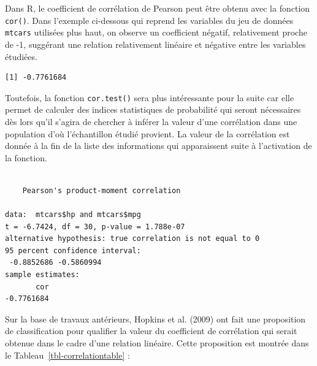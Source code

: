 \documentclass[
  letterpaper,
]{book}
\newenvironment{Shaded}{\begin{snugshade}}{\end{snugshade}}
\newcommand{\AttributeTok}[1]{\textcolor[rgb]{0.40,0.45,0.13}{#1}}
\newcommand{\FunctionTok}[1]{\textcolor[rgb]{0.28,0.35,0.67}{#1}}
\newcommand{\NormalTok}[1]{\textcolor[rgb]{0.00,0.23,0.31}{#1}}
\newcommand{\SpecialCharTok}[1]{\textcolor[rgb]{0.37,0.37,0.37}{#1}}
\newcommand{\StringTok}[1]{\textcolor[rgb]{0.13,0.47,0.30}{#1}}
\begin{document}
Dans R, le coefficient de corrélation de Pearson peut être obtenu avec
la fonction \texttt{cor()}. Dans l'exemple ci-dessous qui reprend les
variables du jeu de données \texttt{mtcars} utilisées plus haut, on
observe un coefficient négatif, relativement proche de -1, suggérant une
relation relativement linéaire et négative entre les variables étudiées.

\begin{Shaded}
\end{Shaded}

\begin{verbatim}
[1] -0.7761684
\end{verbatim}

Toutefois, la fonction \texttt{cor.test()} sera plus intéressante pour
la suite car elle permet de calculer des indices statistiques de
probabilité qui seront nécessaires dès lors qu'il s'agira de chercher à
inférer la valeur d'une corrélation dans une population d'où
l'échantillon étudié provient. La valeur de la corrélation est donnée à
la fin de la liste des informations qui apparaissent suite à
l'activation de la fonction.

\begin{Shaded}
\end{Shaded}

\begin{verbatim}

    Pearson's product-moment correlation

data:  mtcars$hp and mtcars$mpg
t = -6.7424, df = 30, p-value = 1.788e-07
alternative hypothesis: true correlation is not equal to 0
95 percent confidence interval:
 -0.8852686 -0.5860994
sample estimates:
       cor 
-0.7761684 
\end{verbatim}

Sur la base de travaux antérieurs, Hopkins et al. (2009) ont fait une
proposition de classification pour qualifier la valeur du coefficient de
corrélation qui serait obtenue dans le cadre d'une relation linéaire.
Cette proposition est montrée dans le Tableau~\ref{tbl-correlationtable}
:
\end{document}
